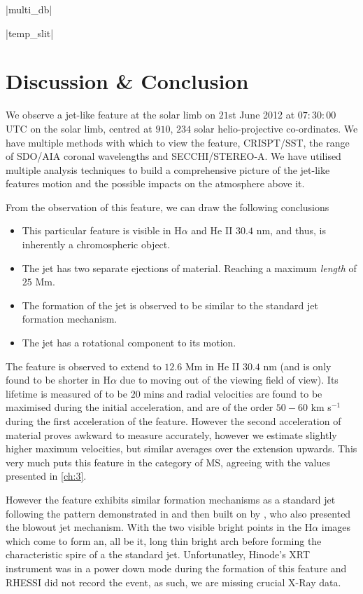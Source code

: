 \py[chapter5]|multi_db|

\py[chapter5]|temp_slit|

\section{Discussion \& Conclusion}
\label{sec:DandC}

We observe a jet-like feature at the solar limb on $21$st June 2012 at $07:30:00$ UTC on the solar limb, centred at $910$, $234$ solar helio-projective co-ordinates.
We have multiple methods with which to view the feature, CRISPT/SST, the range of SDO/AIA coronal wavelengths and SECCHI/STEREO-A.
We have utilised multiple analysis techniques to build a comprehensive picture of the jet-like features motion and the possible impacts on the atmosphere above it.

From the observation of this feature, we can draw the following conclusions
\begin{itemize}
	\item{This particular feature is visible in H$\alpha$ and He II $30.4$ nm, and thus, is inherently a chromospheric object.}
	\item{The jet has two separate ejections of material. Reaching a maximum \emph{length} of $25$ Mm.}
	\item{The formation of the jet is observed to be similar to the standard jet formation mechanism.}
	\item{The jet has a rotational component to its motion.}
\end{itemize}

The feature is observed to extend to $12.6$ Mm in He II $30.4$ nm (and is only found to be shorter in H$\alpha$ due to moving out of the viewing field of view).
Its lifetime is measured of to be $20$ mins and radial velocities are found to be maximised during the initial acceleration, and are of the order $50 - 60$ km s$^{-1}$ during the first acceleration of the feature.
However the second acceleration of material proves awkward to measure accurately, however we estimate slightly higher maximum velocities, but similar averages over the extension upwards. 
This very much puts this feature in the category of MS, agreeing with the values presented in \cref{ch:3}.

However the feature exhibits similar formation mechanisms as a standard jet following the pattern demonstrated in \cite{Shibata1992} and then built on by \cite{Moore2010}, who also presented the blowout jet mechanism.
With the two visible bright points in the H$\alpha$ images which come to form an, all be it, long thin bright arch before forming the characteristic spire of a the standard jet.
Unfortunatley, Hinode's XRT instrument was in a power down mode during the formation of this feature and RHESSI did not record the event, as such, we are missing crucial X-Ray data.

